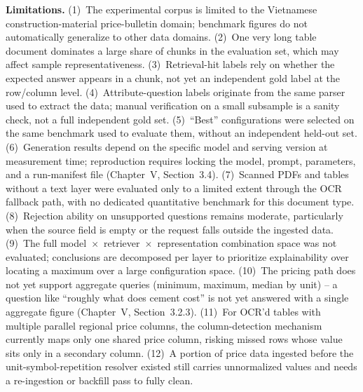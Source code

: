\documentclass[11pt,a4paper]{article}
\begin{document}
\textbf{Limitations.} (1)~The experimental corpus is limited to the
Vietnamese construction-material price-bulletin domain; benchmark figures do
not automatically generalize to other data domains. (2)~One very long table
document dominates a large share of chunks in the evaluation set, which may
affect sample representativeness. (3)~Retrieval-hit labels rely on whether
the expected answer appears in a chunk, not yet an independent gold label at
the row/column level. (4)~Attribute-question labels originate from the same
parser used to extract the data; manual verification on a small subsample
is a sanity check, not a full independent gold set. (5)~``Best''
configurations were selected on the same benchmark used to evaluate them,
without an independent held-out set. (6)~Generation results depend on the
specific model and serving version at measurement time; reproduction
requires locking the model, prompt, parameters, and a run-manifest file
(Chapter~V, Section~3.4). (7)~Scanned PDFs and tables without a text layer
were evaluated only to a limited extent through the OCR fallback path, with
no dedicated quantitative benchmark for this document type. (8)~Rejection
ability on unsupported questions remains moderate, particularly when the
source field is empty or the request falls outside the ingested data.
(9)~The full model~$\times$~retriever~$\times$~representation combination
space was not evaluated; conclusions are decomposed per layer to prioritize
explainability over locating a maximum over a large configuration space.
(10)~The pricing path does not yet support aggregate queries (minimum,
maximum, median by unit) -- a question like ``roughly what does cement
cost'' is not yet answered with a single aggregate figure (Chapter~V,
Section~3.2.3). (11)~For OCR'd tables with multiple parallel regional price
columns, the column-detection mechanism currently maps only one shared price
column, risking missed rows whose value sits only in a secondary column.
(12)~A portion of price data ingested before the unit-symbol-repetition
resolver existed still carries unnormalized values and needs a re-ingestion
or backfill pass to fully clean.
\end{document}
